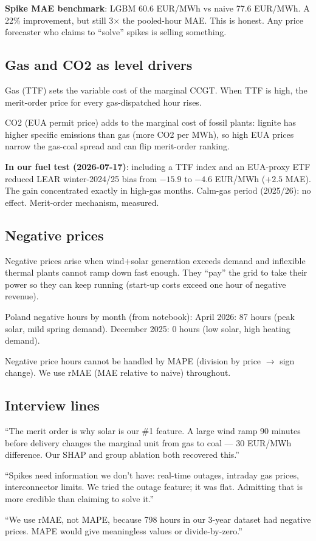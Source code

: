 \textbf{Spike MAE benchmark}: LGBM 60.6 EUR/MWh vs naive 77.6 EUR/MWh.
A 22\% improvement, but still 3$\times$ the pooled-hour MAE. This is honest.
Any price forecaster who claims to ``solve'' spikes is selling something.

\subsection{Gas and CO2 as level drivers}

Gas (TTF) sets the variable cost of the marginal CCGT. When TTF is high,
the merit-order price for every gas-dispatched hour rises.

CO2 (EUA permit price) adds to the marginal cost of fossil plants:
lignite has higher specific emissions than gas (more CO2 per MWh), so
high EUA prices narrow the gas-coal spread and can flip merit-order
ranking.

\textbf{In our fuel test (2026-07-17)}: including a TTF index and an
EUA-proxy ETF reduced LEAR winter-2024/25 bias from $-15.9$ to $-4.6$
EUR/MWh ($+2.5$ MAE). The gain concentrated exactly in high-gas months.
Calm-gas period (2025/26): no effect. Merit-order mechanism, measured.

\subsection{Negative prices}

Negative prices arise when wind+solar generation exceeds demand and
inflexible thermal plants cannot ramp down fast enough. They ``pay'' the
grid to take their power so they can keep running (start-up costs exceed
one hour of negative revenue).

Poland negative hours by month (from notebook):
April 2026: 87 hours (peak solar, mild spring demand).
December 2025: 0 hours (low solar, high heating demand).

Negative price hours cannot be handled by MAPE (division by price $\to$
sign change). We use rMAE (MAE relative to naive) throughout.

\subsection{Interview lines}

``The merit order is why solar is our \#1 feature. A large wind ramp 90
minutes before delivery changes the marginal unit from gas to coal --- 30
EUR/MWh difference. Our SHAP and group ablation both recovered this.''

``Spikes need information we don't have: real-time outages, intraday gas
prices, interconnector limits. We tried the outage feature; it was flat.
Admitting that is more credible than claiming to solve it.''

``We use rMAE, not MAPE, because 798 hours in our 3-year dataset had
negative prices. MAPE would give meaningless values or divide-by-zero.''

